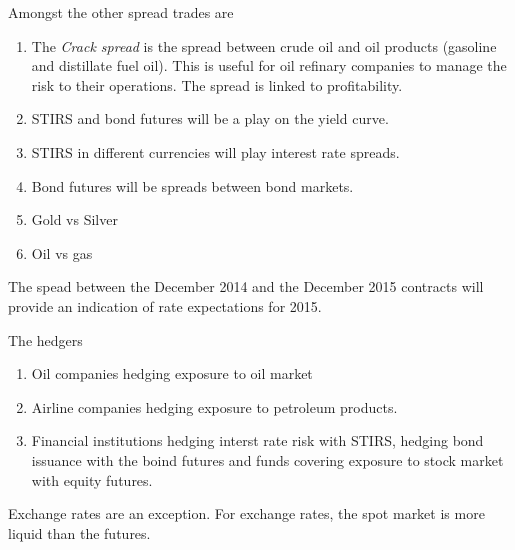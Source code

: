 \documentclass[12pt, a4paper, oneside]{article}\usepackage[]{graphicx}\usepackage[]{color}
\begin{document}
Amongst the other spread trades are 
\begin{enumerate}
\item The \emph{Crack spread} is the spread between crude oil and oil products (gasoline and distillate fuel oil).  This is useful for oil refinary companies to manage the risk to their operations. The spread is linked to profitability. 
\item STIRS and bond futures will be a play on the yield curve.
\item STIRS in different currencies will play interest rate spreads. 
\item Bond futures will be spreads between bond markets. 
\item Gold vs Silver 
\item Oil vs gas
\end{enumerate}

The spead between the December 2014 and the December 2015 contracts will provide an indication of rate expectations for 2015.

The hedgers 
\begin{enumerate}
\item Oil companies hedging exposure to oil market
\item Airline companies hedging exposure to petroleum products.
\item Financial institutions hedging interst rate risk with STIRS, hedging bond issuance with the boind futures and funds covering exposure to stock market with equity futures. 
\end{enumerate}



Exchange rates are an exception.  For exchange rates, the spot market is more liquid than the futures. 
\end{document}

